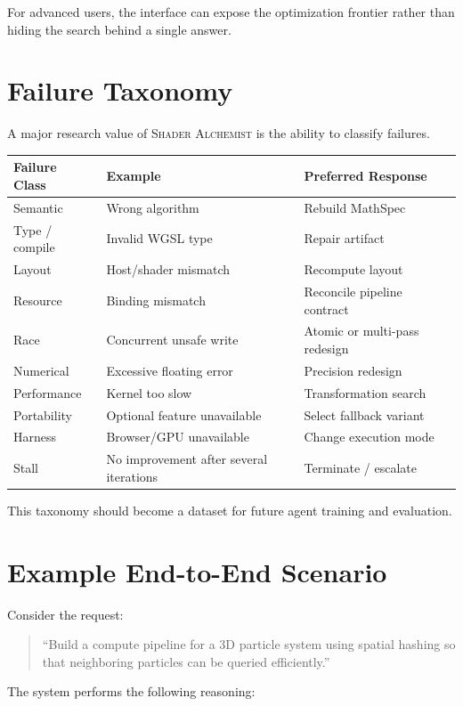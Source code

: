 \documentclass[11pt,a4paper,oneside]{report}
\newcommand{\SA}{\textsc{Shader Alchemist}}
\begin{document}
For advanced users, the interface can expose the optimization frontier rather than hiding the
search behind a single answer.

\chapter{Failure Taxonomy}

A major research value of \SA{} is the ability to classify failures.

\begin{longtable}{p{}p{}p{}}
\toprule
\textbf{Failure Class} & \textbf{Example} & \textbf{Preferred Response}\\
\midrule
Semantic & Wrong algorithm & Rebuild MathSpec\\
Type / compile & Invalid WGSL type & Repair artifact\\
Layout & Host/shader mismatch & Recompute layout\\
Resource & Binding mismatch & Reconcile pipeline contract\\
Race & Concurrent unsafe write & Atomic or multi-pass redesign\\
Numerical & Excessive floating error & Precision redesign\\
Performance & Kernel too slow & Transformation search\\
Portability & Optional feature unavailable & Select fallback variant\\
Harness & Browser/GPU unavailable & Change execution mode\\
Stall & No improvement after several iterations & Terminate / escalate\\
\bottomrule
\end{longtable}

This taxonomy should become a dataset for future agent training and evaluation.

\chapter{Example End-to-End Scenario}

Consider the request:

\begin{quote}
``Build a compute pipeline for a 3D particle system using spatial hashing so that neighboring
particles can be queried efficiently.''
\end{quote}

The system performs the following reasoning:
\end{document}
